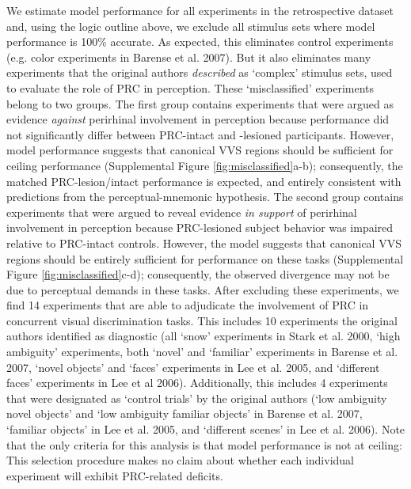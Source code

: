 \documentclass[11pt]{article}
\begin{document}
We estimate model performance for all experiments in the retrospective dataset and, using the logic outline above, we exclude all stimulus sets where model performance is 100\% accurate. As expected, this eliminates control experiments (e.g. color experiments in Barense et al. 2007). But it also eliminates many experiments that the original authors \textit{described} as `complex' stimulus sets, used to evaluate the role of PRC in perception. These `misclassified' experiments belong to two groups. The first group contains experiments that were argued as evidence \textit{against} perirhinal involvement in perception\cite{buffalo1999dissociation, knutson2012visual} because performance did not significantly differ between PRC-intact and -lesioned participants. However, model performance suggests that canonical VVS regions should be sufficient for ceiling performance (Supplemental Figure \ref{fig:misclassified}a-b); consequently, the matched PRC-lesion/intact performance is expected, and entirely consistent with predictions from the perceptual-mnemonic hypothesis. The second group contains experiments that were argued to reveal evidence \textit{in support} of perirhinal involvement in perception\cite{barense2007human, inhoff2019understanding} because PRC-lesioned subject behavior was impaired relative to PRC-intact controls. However, the model suggests that canonical VVS regions should be entirely sufficient for performance on these tasks (Supplemental Figure \ref{fig:misclassified}c-d); consequently, the observed divergence may not be due to perceptual demands in these tasks. After excluding these experiments, we find 14 experiments that are able to adjudicate the involvement of PRC in concurrent visual discrimination tasks. This includes 10 experiments the original authors identified as diagnostic (all ‘snow’ experiments in Stark et al. 2000, ‘high ambiguity' experiments, both `novel' and `familiar' experiments in Barense et al. 2007, `novel objects' and `faces' experiments in Lee et al. 2005, and `different faces' experiments in Lee et al 2006). Additionally, this includes 4 experiments that were designated as ‘control trials’ by the original authors (`low ambiguity novel objects' and `low ambiguity familiar objects' in Barense et al. 2007, `familiar objects' in Lee et al. 2005, and `different scenes' in Lee et al. 2006). Note that the only criteria for this analysis is that model performance is not at ceiling: This selection procedure makes no claim about whether each individual experiment will exhibit PRC-related deficits.
\end{document}
